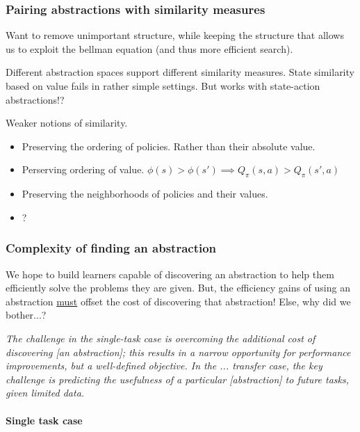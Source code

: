 \subsubsection{Pairing abstractions with similarity measures}

Want to remove unimportant structure, while keeping the structure that allows us
to exploit the bellman equation (and thus more efficient search).

Different abstraction spaces support different similarity measures.
State similarity based on value fails in rather simple settings.
But works with state-action abstractions!?

Weaker notions of similarity.
\begin{itemize}
\tightlist
  \item Preserving the ordering of policies. Rather than their absolute value.
  \item Perserving ordering of value. $\phi(s) > \phi(s') \implies Q_{\pi}(s, a) > Q_{\pi}(s', a)$
  \item Preserving the neighborhoods of policies and their values.
  \item ?
\end{itemize}

\subsubsection{Complexity of finding an abstraction}

We hope to build learners capable of discovering an abstraction to help them efficiently solve the problems they are given.
But, the efficiency gains of using an abstraction \underline{must} offset the cost of
discovering that abstraction! Else, why did we bother...?

\begin{displayquote}
\textit{The challenge in the single-task case is overcoming the additional cost of discovering [an abstraction];
this results in a narrow opportunity for performance improvements, but a well-defined objective.
In the ... transfer case, the key challenge is predicting the usefulness of a particular [abstraction] to future tasks, given limited data.}\cite{Konidaris2019}
\end{displayquote}

\paragraph{Single task case}


